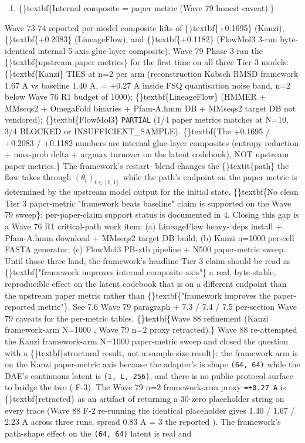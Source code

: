 \documentclass{article}
\begin{document}
\begin{enumerate}
\item \{\}textbf\{Internal composite = paper metric (Wave 79 honest caveat).\}
\end{enumerate}
Wave 73-74 reported per-model composite lifts of \{\}textbf\{+0.1695\} (Kanzi), \{\}textbf\{+0.2083\} (LineageFlow), and \{\}textbf\{+0.1182\} (FlowMol3 3-run byte-identical internal 5-axis glue-layer composite). Wave 79 Phase 3 ran the \{\}textbf\{upstream paper metrics\} for the first time on all three Tier 3 models: \{\}textbf\{Kanzi\} TIES at n=2 per arm (reconstruction Kabsch RMSD framework 1.67 A vs baseline 1.40 A,  = +0.27 A inside FSQ quantisation noise band, n=2 below Wave 76 R1 budget of 1000); \{\}textbf\{LineageFlow\}  (HMMER + MMseqs2 + OmegaFold binaries + Pfam-A.hmm DB + MMseqs2 target DB not vendored); \{\}textbf\{FlowMol3\} \texttt{PARTIAL} (1/4 paper metrics matches at N=10, 3/4 BLOCKED or INSUFFICIENT\_SAMPLE). \{\}textbf\{The +0.1695 / +0.2083 / +0.1182 numbers are internal glue-layer composites (entropy reduction + max-prob delta + argmax turnover on the latent codebook), NOT upstream paper metrics.\} The framework's restart- blend changes the \{\}textit\{path\} the flow takes through $(\theta_t)_{t \in [0,1]}$ while the path's endpoint on the paper metric is determined by the upstream model output for the initial state. \{\}textbf\{No clean Tier 3 paper-metric "framework beats baseline" claim is supported on the Wave 79 sweep\}; per-paper-claim support status is documented in  4. Closing this gap is a Wave 76 R1 critical-path work item: (a) LineageFlow heavy- deps install + Pfam-A.hmm download + MMseqs2 target DB build; (b) Kanzi n=1000 per-cell FASTA generator; (c) FlowMol3 PB-xtb pipeline + N500 paper-metric sweep. Until those three land, the framework's headline Tier 3 claim should be read as \{\}textbf\{"framework improves internal composite axis"\}  a real, byte-stable, reproducible effect on the latent codebook that is on a different endpoint than the upstream paper metric  rather than \{\}textbf\{"framework improves the paper-reported metric"\}. See 7.6 Wave 79 paragraph + 7.3 / 7.4 / 7.5 per-section Wave 79 caveats for the per-metric tables. \{\}textbf\{Wave 88 refinement (Kanzi framework-arm N=1000  , Wave 79 n=2 proxy retracted).\} Wave 88 re-attempted the Kanzi framework-arm N=1000 paper-metric sweep and closed the question with a \{\}textbf\{structural result, not a sample-size result\}: the framework arm is  on the Kanzi paper-metric axis because the adapter's  is shape \texttt{(64, 64)} while the DAE's continuous latent is \texttt{(1, L, 256)}, and there is no public protocol surface to bridge the two ( F-3). The Wave 79 n=2 framework-arm proxy \texttt{=+0.27 A} is \{\}textbf\{retracted\} as an artifact of  returning a 30-zero placeholder string on every trace (Wave 88 F-2  re-running the identical placeholder gives 1.40 / 1.67 / 2.23 A across three runs, spread 0.83 A = 3 the reported ). The framework's path-shape effect on the \texttt{(64, 64)} latent is real and 
\end{document}

